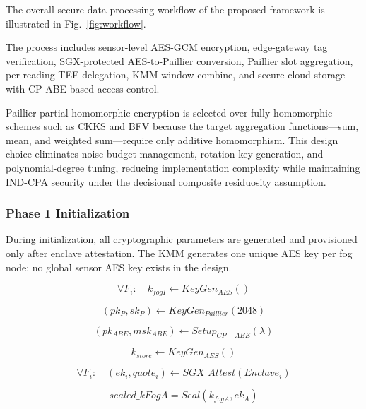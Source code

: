 \documentclass[conference]{IEEEtran}
\begin{document}
    The overall secure data-processing workflow of the proposed framework is illustrated in Fig.~\ref{fig:workflow}.

    The process includes sensor-level AES-GCM encryption, edge-gateway tag verification, SGX-protected AES-to-Paillier conversion, Paillier slot aggregation, per-reading TEE delegation, KMM window combine, and secure cloud storage with CP-ABE-based access control.

    Paillier partial homomorphic encryption is selected over fully homomorphic schemes such as CKKS and BFV because the target aggregation functions---sum, mean, and weighted sum---require only additive homomorphism. This design choice eliminates noise-budget management, rotation-key generation, and polynomial-degree tuning, reducing implementation complexity while maintaining IND-CPA security under the decisional composite residuosity assumption.

    \subsubsection{\textbf{Phase 1 Initialization}}

    During initialization, all cryptographic parameters are generated and provisioned only after enclave attestation. The KMM generates one unique AES key per fog node; no global sensor AES key exists in the design.

    \begin{equation}
    \forall F_i:\quad k_{fogI} \leftarrow KeyGen_{AES}()
    \end{equation}

    \begin{equation}
    (pk_P, sk_P) \leftarrow KeyGen_{Paillier}(2048)
    \end{equation}

    \begin{equation}
    (pk_{ABE}, msk_{ABE}) \leftarrow Setup_{CP-ABE}(\lambda)
    \end{equation}

    \begin{equation}
    k_{store} \leftarrow KeyGen_{AES}()
    \end{equation}

    \begin{equation}
    \forall F_i:\quad (ek_i, quote_i) \leftarrow SGX\_Attest(Enclave_i)
    \end{equation}

    \begin{equation}
    sealed\_kFogA = Seal(k_{fogA}, ek_A)
    \end{equation}
\end{document}
